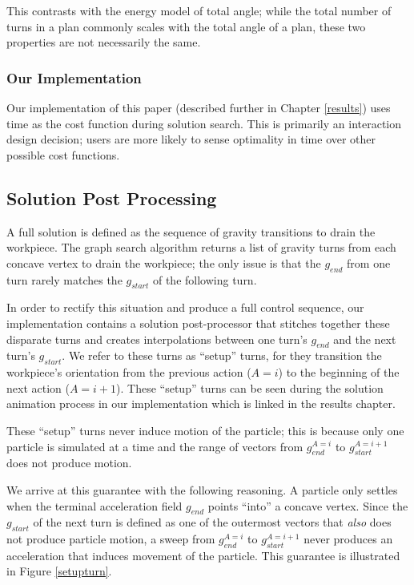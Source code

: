 This contrasts with the energy model of total angle; while the total number of turns in a plan commonly scales with the total angle of a plan, these two properties are not necessarily the same.

		\subsubsection{Our Implementation}

Our implementation of this paper (described further in Chapter \ref{results}) uses time as the cost function during solution search. This is primarily an interaction design decision; users are more likely to sense optimality in time over other possible cost functions.

	\subsection{Solution Post Processing}

A full solution is defined as the sequence of gravity transitions to drain the workpiece. The graph search algorithm returns a list of gravity turns from each concave vertex to drain the workpiece; the only issue is that the $g_{end}$ from one turn rarely matches the $g_{start}$ of the following turn.

In order to rectify this situation and produce a full control sequence, our implementation contains a solution post-processor that stitches together these disparate turns and creates interpolations between one turn's $g_{end}$ and the next turn's $g_{start}$. We refer to these turns as ``setup'' turns, for they transition the workpiece's orientation from the previous action ($A=i$) to the beginning of the next action ($A=i + 1$). These ``setup'' turns can be seen during the solution animation process in our implementation which is linked in the results chapter.

These ``setup'' turns never induce motion of the particle; this is because only one particle is simulated at a time and the range of vectors from $g_{end}^{A=i}$ to $g_{start}^{A=i + 1}$ does not produce motion.

We arrive at this guarantee with the following reasoning. A particle only settles when the terminal acceleration field $g_{end}$ points ``into'' a concave vertex. Since the $g_{start}$ of the next turn is defined as one of the outermost vectors that \emph{also} does not produce particle motion, a sweep from $g_{end}^{A=i}$ to $g_{start}^{A=i + 1}$ never produces an acceleration that induces movement of the particle. This guarantee is illustrated in Figure \ref{setupturn}.

